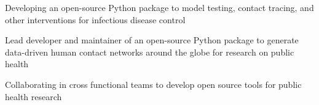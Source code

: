 \begin{cventries}
{\begin{cvitems}
        \item {Developing an open-source Python package to model testing, contact tracing, and other interventions for infectious disease control}
        \item {Lead developer and maintainer of an open-source Python package to generate data-driven human contact networks around the globe for research on public health}
    \item {Collaborating in cross functional teams to develop open source tools
    for public health research
    }
      \end{cvitems}     
    }
\vspace{1mm}


\end{cventries}
